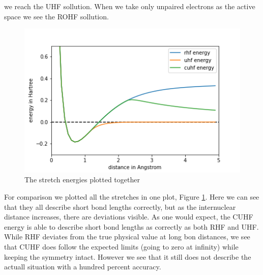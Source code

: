 \documentclass[twoside,twocolumn,9pt]{article}
\begin{document}
we reach the UHF sollution. When we take only unpaired electrons as the active space we see the ROHF sollution.
\begin{center}
  \begin{figure}[h]
    \includegraphics[width=\linewidth]{./../notes/figures/combo.png}
    \caption{The stretch energies plotted together}
    \label{fig:combo}
  \end{figure}
\end{center}
For comparison we plotted all the stretches in one plot, Figure \ref{fig:combo}. Here we can see that they all describe short bond lengths correctly, but as the internuclear distance
increases, there are deviations visible. As one would expect, the CUHF energy is able to describe short bond lengths as correctly as both RHF and UHF. While RHF deviates from the
true physical value at long bon distances, we see that CUHF does follow the expected limits (going to zero at infinity) while keeping the symmetry intact. However we see that it still
does not describe the actuall situation with a hundred percent accuracy.
\end{document}
